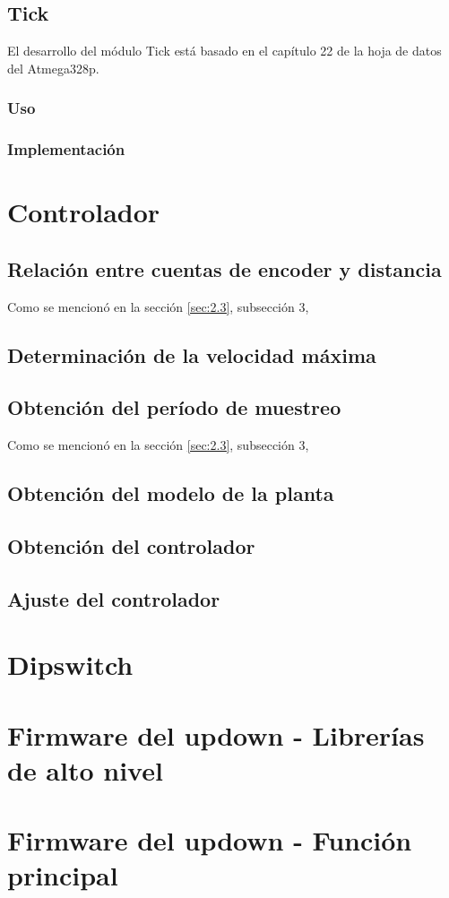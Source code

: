 \subsection{Tick}
El desarrollo del módulo Tick está basado en el capítulo 22 de la hoja de datos del Atmega328p.

\subsubsection{Uso}

\subsubsection{Implementación}


\section{Controlador} \label{sec:\thesection}

\subsection{Relación entre cuentas de encoder y distancia}
Como se mencionó en la sección \ref{sec:2.3}, subsección 3, 

\subsection{Determinación de la velocidad máxima}

\subsection{Obtención del período de muestreo}
Como se mencionó en la sección \ref{sec:2.3}, subsección 3, 

\subsection{Obtención del modelo de la planta}

\subsection{Obtención del controlador}

\subsection{Ajuste del controlador}


\section{Dipswitch} \label{sec:\thesection}

\section{Firmware del updown - Librerías de alto nivel} \label{sec:\thesection}

\section{Firmware del updown - Función principal} \label{sec:\thesection}



